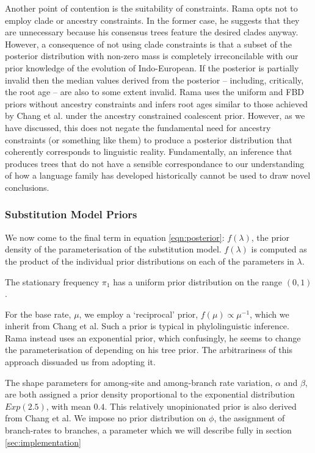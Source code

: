 \documentclass[10pt,journal,compsoc]{IEEEtran}
\begin{document}
Another point of contention is the suitability of constraints. Rama opts not to employ clade or ancestry constraints. In the former case, he suggests that they are unnecessary because his consensus trees feature the desired clades anyway. However, a consequence of not using clade constraints is that a subset of the posterior distribution with non-zero mass is completely irreconcilable with our prior knowledge of the evolution of Indo-European. If the posterior is partially invalid then the median values derived from the posterior -- including, critically, the root age -- are also to some extent invalid. Rama uses the uniform and FBD priors without ancestry constraints and infers root ages similar to those achieved by Chang et al. under the ancestry constrained coalescent prior. However, as we have discussed, this does not negate the fundamental need for ancestry constraints (or something like them) to produce a posterior distribution that coherently corresponds to linguistic reality. Fundamentally, an inference that produces trees that do not have a sensible correspondance to our understanding of how a language family has developed historically cannot be used to draw novel conclusions.

\subsubsection{Substitution Model Priors}

We now come to the final term in equation \eqref{eqn:posterior}: $f(\lambda)$, the prior density of the parameterisation of the substitution model. $f(\lambda)$ is computed as the product of the individual prior distributions on each of the parameters in $\lambda$.

The stationary frequency $\pi_1$ has a uniform prior distribution on the range $(0, 1)$.

For the base rate, $\mu$, we employ a `reciprocal' prior, $f(\mu) \propto \mu^{-1}$, which we inherit from Chang et al. Such a prior is typical in phylolinguistic inference. Rama instead uses an exponential prior, which confusingly, he seems to change the parameterisation of depending on his tree prior. The arbitrariness of this approach dissuaded us from adopting it.

The shape parameters for among-site and among-branch rate variation, $\alpha$ and $\beta$, are both assigned a prior density proportional to the exponential distribution $Exp(2.5)$, with mean $0.4$. This relatively unopinionated prior is also derived from Chang et al. We impose no prior distribution on $\phi$, the assignment of branch-rates to branches, a parameter which we will describe fully in section \ref{sec:implementation} 
\end{document}
